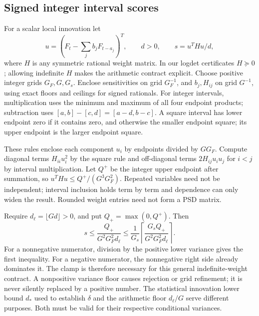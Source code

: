 \subsection{Signed integer interval scores}
\label{app:integer-scores}
For a scalar local innovation let
\[
 u=(F_t-\sum_j b_jF_{t-a_j})^T,\qquad d>0,\qquad s=u^THu/d,
\]
where $H$ is any symmetric rational weight matrix. In our logdet certificates
$H\succeq0$; allowing indefinite $H$ makes the arithmetic contract explicit.
Choose positive integer grids $G_F,G,G_s$. Enclose sensitivities on grid
$G_F^{-1}$, and $b_j,H_{ij}$ on grid $G^{-1}$, using exact floors and
ceilings for signed rationals. For integer intervals, multiplication uses
the minimum and maximum of all four endpoint products; subtraction uses
$[a,b]-[c,d]=[a-d,b-c]$. A square interval has lower endpoint zero if it
contains zero, and otherwise the smaller endpoint square; its upper endpoint
is the larger endpoint square.

These rules enclose each component $u_i$ by endpoints divided by $GG_F$.
Compute diagonal terms $H_{ii}u_i^2$ by the square rule and off-diagonal
terms $2H_{ij}u_iu_j$ for $i<j$ by interval multiplication. Let $Q^+$
be the integer upper endpoint after summation, so
$u^THu\le Q^+/(G^3G_F^2)$. Repeated variables need not be independent;
interval inclusion holds term by term and dependence can only widen the
result. Rounded weight entries need not form a PSD matrix.

Require $d_\ell=\lfloor Gd\rfloor>0$, and put $Q_+=\max(0,Q^+)$.
Then
\begin{equation}\label{eq:integer-arc-bound}
 s\le\frac{Q_+}{G^2G_F^2d_\ell}
 \le\frac1{G_s}\left\lceil
 \frac{G_s Q_+}{G^2G_F^2d_\ell}\right\rceil.
\end{equation}
For a nonnegative numerator, division by the positive lower variance gives
the first inequality. For a negative numerator, the nonnegative right side
already dominates it. The clamp is therefore necessary for this general
indefinite-weight contract. A nonpositive variance floor causes rejection
or grid refinement; it is never silently replaced by a positive number.
The statistical innovation lower bound $d_*$ used to establish $\delta$
and the arithmetic floor $d_\ell/G$ serve different purposes. Both must
be valid for their respective conditional variances.

